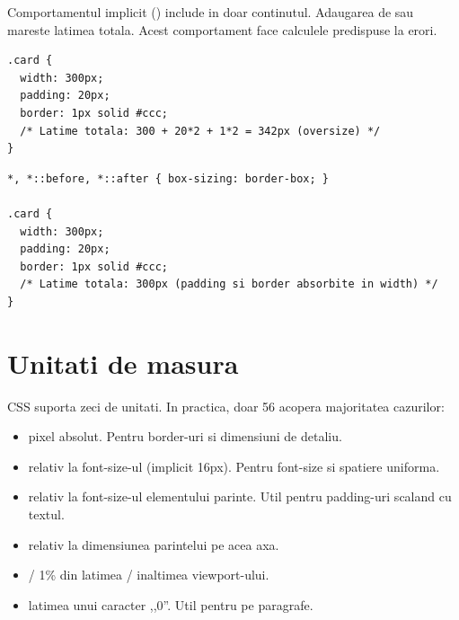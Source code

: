 Comportamentul implicit () include in  doar continutul. Adaugarea de  sau  mareste latimea totala. Acest comportament face calculele predispuse la erori.

\begin{dano}
\begin{lstlisting}[style=css, numbers=none]
.card {
  width: 300px;
  padding: 20px;
  border: 1px solid #ccc;
  /* Latime totala: 300 + 20*2 + 1*2 = 342px (oversize) */
}
\end{lstlisting}
\end{dano}

\begin{dado}
\begin{lstlisting}[style=css, numbers=none]
*, *::before, *::after { box-sizing: border-box; }

.card {
  width: 300px;
  padding: 20px;
  border: 1px solid #ccc;
  /* Latime totala: 300px (padding si border absorbite in width) */
}
\end{lstlisting}
\end{dado}

\section{Unitati de masura}

CSS suporta zeci de unitati. In practica, doar 5\textendash{}6 acopera majoritatea cazurilor:

\begin{itemize}
  \item {} \textendash{} pixel absolut. Pentru border-uri si dimensiuni de detaliu.
  \item {} \textendash{} relativ la font-size-ul  (implicit 16px). Pentru font-size si spatiere uniforma.
  \item {} \textendash{} relativ la font-size-ul elementului parinte. Util pentru padding-uri scaland cu textul.
  \item \code{\%} \textendash{} relativ la dimensiunea parintelui pe acea axa.
  \item {} /  \textendash{} 1\% din latimea / inaltimea viewport-ului.
  \item {} \textendash{} latimea unui caracter ,,0''. Util pentru  pe paragrafe.
\end{itemize}

